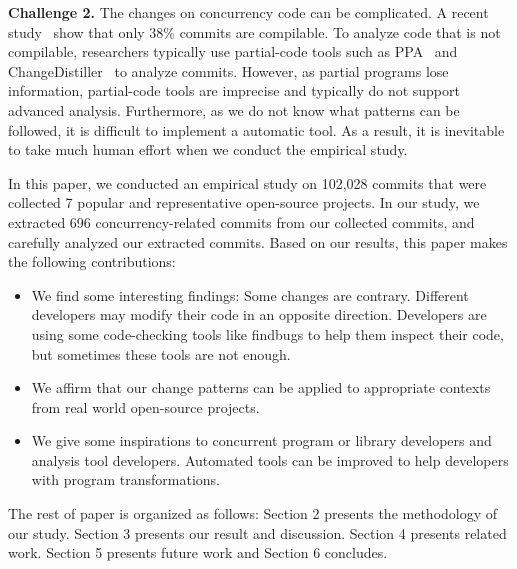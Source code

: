 \noindent
\textbf{Challenge 2.} The changes on concurrency code can be complicated. A recent study~\cite{tufano2016there} show that only 38\% commits are compilable. To analyze code that is not compilable, researchers typically use partial-code tools such as PPA~\cite{DagenaisH08ppa} and ChangeDistiller~\cite{fluri2007change} to analyze commits. However, as partial programs lose information, partial-code tools are imprecise and typically do not support advanced analysis. Furthermore, as we do not know what patterns can be followed, it is difficult to implement a automatic tool. As a result, it is inevitable to take much human effort when we conduct the empirical study.

In this paper, we conducted an empirical study on 102,028 commits that were collected 7 popular and representative open-source projects. In our study, we extracted 696 concurrency-related commits from our collected commits, and carefully analyzed our extracted commits. Based on our results, this paper makes the following contributions:

\begin{itemize}
	\item We find some interesting findings: Some changes are contrary. Different developers may modify their code in an opposite direction. Developers are using some code-checking tools like findbugs to help them inspect their code, but sometimes these tools are not enough.
	\item We affirm that our change patterns can be applied to appropriate  contexts from real world open-source projects.
	\item We give some inspirations to concurrent program or library developers and analysis tool developers. Automated tools can be improved to help developers with program transformations.
\end{itemize}

The rest of paper is organized as follows: Section 2 presents the methodology of our study. Section 3 presents our result and discussion. Section 4 presents related work. Section 5 presents future work and Section 6 concludes.
